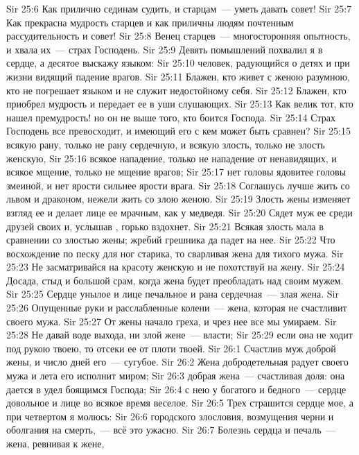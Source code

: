 \vs Sir 25:6 Как прилично сединам судить, и старцам~--- уметь давать совет!
\vs Sir 25:7 Как прекрасна мудрость старцев и как приличны людям почтенным рассудительность и совет!
\vs Sir 25:8 Венец старцев~--- многосторонняя опытность, и хвала их~--- страх Господень.
\vs Sir 25:9 Девять помышлений похвалил я в сердце, а десятое выскажу языком:
\vs Sir 25:10  человек, радующийся о детях и при жизни видящий падение врагов.
\vs Sir 25:11 Блажен, кто живет с женою разумною, кто не погрешает языком и не служит недостойному себя.
\vs Sir 25:12 Блажен, кто приобрел мудрость и передает ее в уши слушающих.
\vs Sir 25:13 Как велик тот, кто нашел премудрость! но он не выше того, кто боится Господа.
\vs Sir 25:14 Страх Господень все превосходит, и имеющий его с кем может быть сравнен?
\rsbpar\vs Sir 25:15  всякую рану, только не рану сердечную, и всякую злость, только не злость женскую,
\vs Sir 25:16 всякое нападение, только не нападение от ненавидящих, и всякое мщение, только не мщение врагов;
\vs Sir 25:17 нет головы ядовитее головы змеиной, и нет ярости сильнее ярости врага.
\vs Sir 25:18 Соглашусь лучше жить со львом и драконом, нежели жить со злою женою.
\vs Sir 25:19 Злость жены изменяет взгляд ее и делает лице ее мрачным, как у медведя.
\vs Sir 25:20 Сядет муж ее среди друзей своих и, услышав , горько вздохнет.
\vs Sir 25:21 Всякая злость мала в сравнении со злостью жены; жребий грешника да падет на нее.
\vs Sir 25:22 Что восхождение по песку для ног старика, то сварливая жена для тихого мужа.
\vs Sir 25:23 Не засматривайся на красоту женскую и не похотствуй на жену.
\vs Sir 25:24 Досада, стыд и большой срам, когда жена будет преобладать над своим мужем.
\vs Sir 25:25 Сердце унылое и лице печальное и рана сердечная~--- злая жена.
\vs Sir 25:26 Опущенные руки и расслабленные колени~--- жена, которая не счастливит своего мужа.
\vs Sir 25:27 От жены начало греха, и чрез нее все мы умираем.
\vs Sir 25:28 Не давай воде выхода, ни злой жене~--- власти;
\vs Sir 25:29 если она не ходит под рукою твоею, то отсеки ее от плоти твоей.
\vs Sir 26:1 Счастлив муж доброй жены, и число дней его~--- сугубое.
\vs Sir 26:2 Жена добродетельная радует своего мужа и лета его исполнит миром;
\vs Sir 26:3 добрая жена~--- счастливая доля: она дается в удел боящимся Господа;
\vs Sir 26:4 с нею у богатого и бедного~--- сердце довольное и лице во всякое время веселое.
\vs Sir 26:5 Трех страшится сердце мое, а при четвертом я молюсь:
\vs Sir 26:6 городского злословия, возмущения черни и оболгания на смерть,~--- всё это ужасно.
\vs Sir 26:7 Болезнь сердца и печаль~--- жена, ревнивая к  жене,
